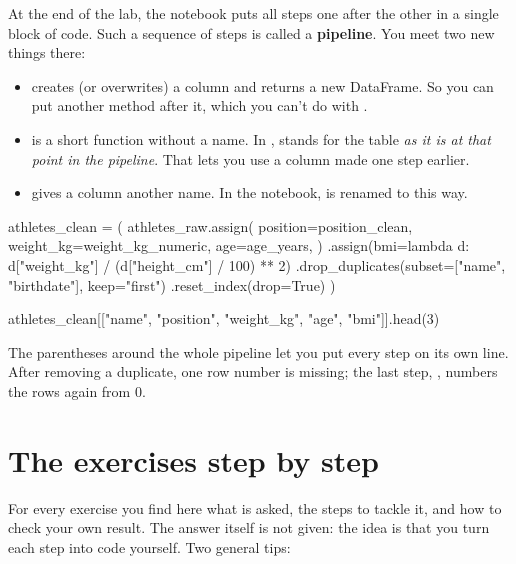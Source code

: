 \documentclass[11pt,a4paper]{article}
\begin{document}
At the end of the lab, the notebook puts all steps one after the other
in a single block of code. Such a sequence of steps is called a
\textbf{pipeline}. You meet two new things there:

\begin{itemize}
  \item {} creates (or overwrites) a column and
        returns a new DataFrame. So you can put another method after it,
        which you can't do with .
  \item {} is a short function without a name. In
        , 
        stands for the table \emph{as it is at that point in the
        pipeline}. That lets you use a column made one step earlier.
  \item {} gives a column another
        name. In the notebook,  is renamed to  this
        way.
\end{itemize}

\begin{python}[noout]
athletes_clean = (
    athletes_raw.assign(
        position=position_clean,
        weight_kg=weight_kg_numeric,
        age=age_years,
    )
    .assign(bmi=lambda d: d["weight_kg"] / (d["height_cm"] / 100) ** 2)
    .drop_duplicates(subset=["name", "birthdate"], keep="first")
    .reset_index(drop=True)
)
\end{python}
\begin{python}
athletes_clean[["name", "position", "weight_kg", "age", "bmi"]].head(3)
\end{python}

The parentheses around the whole pipeline let you put every step on its
own line. After removing a duplicate, one row number is missing; the last
step, , numbers the rows again from 0.

\section{The exercises step by step}

For every exercise you find here what is asked, the steps to tackle it,
and how to check your own result. The answer itself is not given: the
idea is that you turn each step into code yourself. Two general tips:
\end{document}
